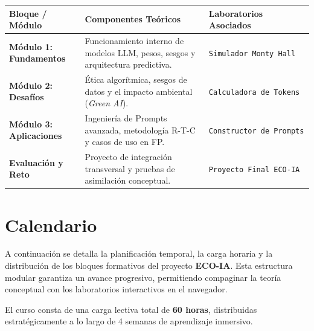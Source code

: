\documentclass[
  spanish,
  letterpaper,
  DIV=11,
  numbers=noendperiod,
  oneside]{scrreprt}
\newcounter{none} %
\begin{document}
{\def\LTcaptype{none} %
\begin{longtable}[]{@{}
  >{\raggedright\arraybackslash}p{}
  >{\raggedright\arraybackslash}p{}
  >{\raggedright\arraybackslash}p{}@{}}
\toprule\noalign{}
\begin{minipage}[b]{\linewidth}\raggedright
Bloque / Módulo
\end{minipage} & \begin{minipage}[b]{\linewidth}\raggedright
Componentes Teóricos
\end{minipage} & \begin{minipage}[b]{\linewidth}\raggedright
Laboratorios Asociados
\end{minipage} \\
\midrule\noalign{}
\endhead
\bottomrule\noalign{}
\endlastfoot
\textbf{Módulo 1: Fundamentos} & Funcionamiento interno de modelos LLM,
pesos, sesgos y arquitectura predictiva. &
\texttt{Simulador\ Monty\ Hall} \\
\textbf{Módulo 2: Desafíos} & Ética algorítmica, sesgos de datos y el
impacto ambiental (\emph{Green AI}). &
\texttt{Calculadora\ de\ Tokens} \\
\textbf{Módulo 3: Aplicaciones} & Ingeniería de Prompts avanzada,
metodología R-T-C y casos de uso en FP. &
\texttt{Constructor\ de\ Prompts} \\
\textbf{Evaluación y Reto} & Proyecto de integración transversal y
pruebas de asimilación conceptual. & \texttt{Proyecto\ Final\ ECO-IA} \\
\end{longtable}
}

\chapter{Calendario}\label{calendario}

A continuación se detalla la planificación temporal, la carga horaria y
la distribución de los bloques formativos del proyecto \textbf{ECO-IA}.
Esta estructura modular garantiza un avance progresivo, permitiendo
compaginar la teoría conceptual con los laboratorios interactivos en el
navegador.

\begin{tcolorbox}[enhanced jigsaw, arc=.35mm, bottomrule=.15mm, bottomtitle=1mm, breakable, colback=white, colbacktitle=quarto-callout-note-color!10!white, colframe=quarto-callout-note-color-frame, coltitle=black, left=2mm, leftrule=.75mm, opacityback=0, opacitybacktitle=0.6, rightrule=.15mm, title=\textcolor{quarto-callout-note-color}{\faInfo}\hspace{0.5em}{⏳ Duración Total del Programa}, titlerule=0mm, toprule=.15mm, toptitle=1mm]

El curso consta de una carga lectiva total de \textbf{60 horas},
distribuidas estratégicamente a lo largo de 4 semanas de aprendizaje
inmersivo.

\end{tcolorbox}
\end{document}
